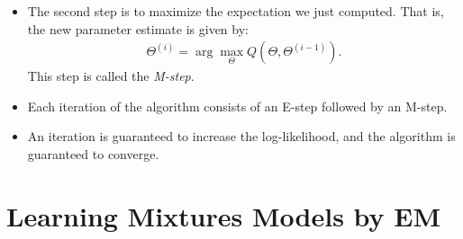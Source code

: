 \documentclass[10pt]{article}
\begin{document}
\begin{itemize}
    \item The second step is to maximize the expectation we just computed. That is, the new parameter estimate is given by:
    \begin{align*}
      \Theta^{(i)} = \arg\max_\Theta Q(\Theta, \Theta^{(i-1)}).
    \end{align*}
    This step is called the \emph{M-step}.
    
    \item Each iteration of the algorithm consists of an E-step followed by an M-step.
    
    \item An iteration is guaranteed to increase the log-likelihood, and the algorithm is guaranteed to converge.
  \end{itemize}
  
  \section{Learning Mixtures Models by EM}
\end{document}
